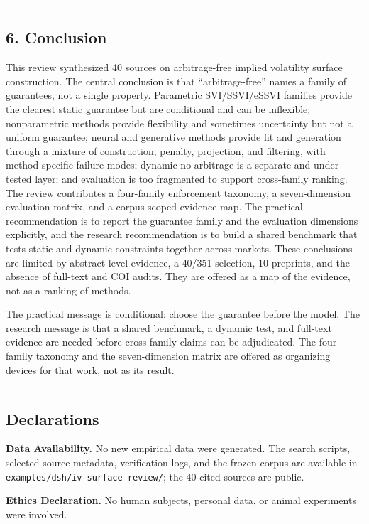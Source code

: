 \documentclass[11pt]{article}
\begin{document}
\par\medskip\hrule\medskip
\subsection*{6. Conclusion}
This review synthesized 40 sources on arbitrage-free implied volatility surface construction. The central conclusion is that “arbitrage-free” names a family of guarantees, not a single property. Parametric SVI/SSVI/eSSVI families provide the clearest static guarantee but are conditional and can be inflexible; nonparametric methods provide flexibility and sometimes uncertainty but not a uniform guarantee; neural and generative methods provide fit and generation through a mixture of construction, penalty, projection, and filtering, with method-specific failure modes; dynamic no-arbitrage is a separate and under-tested layer; and evaluation is too fragmented to support cross-family ranking. The review contributes a four-family enforcement taxonomy, a seven-dimension evaluation matrix, and a corpus-scoped evidence map. The practical recommendation is to report the guarantee family and the evaluation dimensions explicitly, and the research recommendation is to build a shared benchmark that tests static and dynamic constraints together across markets. These conclusions are limited by abstract-level evidence, a 40/351 selection, 10 preprints, and the absence of full-text and COI audits. They are offered as a map of the evidence, not as a ranking of methods.

The practical message is conditional: choose the guarantee before the model. The research message is that a shared benchmark, a dynamic test, and full-text evidence are needed before cross-family claims can be adjudicated. The four-family taxonomy and the seven-dimension matrix are offered as organizing devices for that work, not as its result.

\par\medskip\hrule\medskip
\subsection*{Declarations}
\textbf{Data Availability.} No new empirical data were generated. The search scripts, selected-source metadata, verification logs, and the frozen corpus are available in \texttt{examples/dsh/iv-surface-review/}; the 40 cited sources are public.

\textbf{Ethics Declaration.} No human subjects, personal data, or animal experiments were involved.
\end{document}
